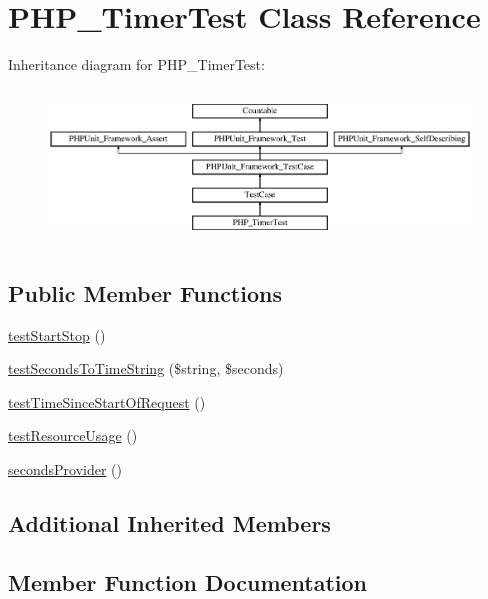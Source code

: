 \hypertarget{class_p_h_p___timer_test}{}\section{P\+H\+P\+\_\+\+Timer\+Test Class Reference}
\label{class_p_h_p___timer_test}
Inheritance diagram for P\+H\+P\+\_\+\+Timer\+Test\+:\begin{figure}[H]
\begin{center}
\leavevmode
\includegraphics[height=4.129793cm]{class_p_h_p___timer_test}
\end{center}
\end{figure}
\subsection*{Public Member Functions}
\begin{DoxyCompactItemize}
\item 
\mbox{\hyperlink{class_p_h_p___timer_test_a9307c9ef3dfc593baa9870563a8f81b1}{test\+Start\+Stop}} ()
\item 
\mbox{\hyperlink{class_p_h_p___timer_test_af40f5a3ef3dbc64dd106c1aa1a13f7e7}{test\+Seconds\+To\+Time\+String}} (\$string, \$seconds)
\item 
\mbox{\hyperlink{class_p_h_p___timer_test_afe94bd24909637b92820b291932f6a2a}{test\+Time\+Since\+Start\+Of\+Request}} ()
\item 
\mbox{\hyperlink{class_p_h_p___timer_test_a6e1d24fa054f6a20136d57da44088428}{test\+Resource\+Usage}} ()
\item 
\mbox{\hyperlink{class_p_h_p___timer_test_a7656d1a8de06ead1bc49ffe0cf17bc98}{seconds\+Provider}} ()
\end{DoxyCompactItemize}
\subsection*{Additional Inherited Members}


\subsection{Member Function Documentation}
\mbox{\label{class_p_h_p___timer_test_a7656d1a8de06ead1bc49ffe0cf17bc98}} 
